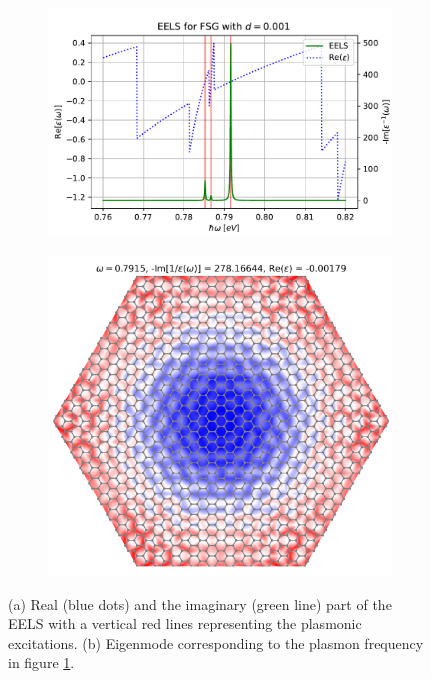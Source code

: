 \begin{figure}[H]
\centering
\begin{subfigure}[b]{.55\textwidth}
  \centering
  \includegraphics[width=\textwidth]{img/eels_BN_076-082.pdf}
  \caption{}
  \label{fig:eels_bn_s1}
\end{subfigure}
\hfill
\begin{subfigure}[b]{.44\textwidth}
  \centering
  \includegraphics[width=\textwidth]{img/bn_plasmons_0.7915.png}
  \caption{}
  \label{fig:eigenmode_bn_s1}
\end{subfigure}
\caption{(a) Real (blue dots) and the imaginary (green line) part of the EELS with a vertical red lines representing the plasmonic excitations. (b) Eigenmode corresponding to the plasmon frequency in figure \ref{fig:eels_bn_s1}.}
\end{figure}



